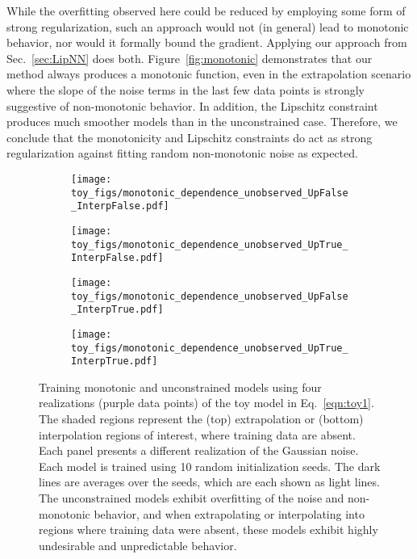 \documentclass{article}
\begin{document}
While the overfitting observed here could be reduced by employing some form of strong regularization, such an approach would not (in general) lead to monotonic behavior, nor would it formally bound the gradient.
Applying our approach from Sec.~\ref{sec:LipNN} does both.
Figure~\ref{fig:monotonic} demonstrates that our method always produces a monotonic function, even in the extrapolation scenario where the slope of the noise terms in the last few data points is strongly suggestive of non-monotonic behavior. 
In addition, the Lipschitz constraint produces much smoother models than in the unconstrained case. 
Therefore, we conclude that the monotonicity and Lipschitz constraints do act as strong regularization against fitting random non-monotonic noise as expected. 


\begin{figure}[t!]
    \centering
    \begin{subfigure}[]{0.45\textwidth}
    \texttt{[image: toy\_figs/monotonic\_dependence\_unobserved\_UpFalse\_InterpFalse.pdf]}
    \end{subfigure}
    \begin{subfigure}[]{0.45\textwidth}
    \texttt{[image: toy\_figs/monotonic\_dependence\_unobserved\_UpTrue\_InterpFalse.pdf]}
    \end{subfigure}
    \begin{subfigure}[]{0.45\textwidth}
    \texttt{[image: toy\_figs/monotonic\_dependence\_unobserved\_UpFalse\_InterpTrue.pdf]}
    \end{subfigure}
    \begin{subfigure}[]{0.45\textwidth}
    \texttt{[image: toy\_figs/monotonic\_dependence\_unobserved\_UpTrue\_InterpTrue.pdf]}
    \end{subfigure}
    \caption{Training monotonic and unconstrained models using four realizations (purple data points) of the toy model in Eq.~\eqref{eqn:toy1}. 
    The shaded regions represent the (top) extrapolation or (bottom) interpolation regions of interest, where training data are absent. 
    Each panel presents a different realization of the Gaussian noise. 
    Each model is trained using 10 random initialization seeds. %
    The dark lines are averages over the seeds, which are each shown as light lines. 
    The unconstrained models exhibit overfitting of the noise and non-monotonic behavior, and when extrapolating or interpolating into regions where training data were absent, these models exhibit highly undesirable and unpredictable behavior.    
}
\end{figure}
\end{document}
